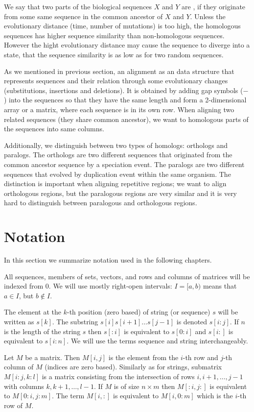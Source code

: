 We say that two parts of the biological sequences $X$ and $Y$ are
, if they originate from some same sequence in the
common ancestor of $X$ and $Y$. Unless the evolutionary distance (time, number
of mutations) is too high, the homologous sequences has higher sequence
similarity than non-homologous sequences. However the hight evolutionary
distance may cause the sequence to diverge into a state, that the sequence
similarity is as low as for two random sequences.

As we mentioned in previous section, an alignment as an data structure that
represents sequences and their relation through some evolutionary changes
(substitutions, insertions and deletions).  It is obtained by adding gap
symbols ($-$) into the sequences so that they have the same length and form a
2-dimensional array or a matrix, where each sequence is in its own row. When
aligning two related sequences (they share common ancestor), we want to
homologous parts of the sequences into same columns.

Additionally, we distinguish between two types of homologs: orthologs and
paralogs. The orthologs are two different sequences that originated from the
common ancestor sequence by a speciation event. The paralogs are two different
sequences that evolved by duplication event within the same organism. The
distinction is important when aligning repetitive regions; we want to align
orthologous regions, but the paralogous regions are very similar and it is very
hard to distinguish between paralogous and orthologous regions.

\section{Notation}

In this section we summarize notation used in the following
chapters.

All sequences, members of sets, vectors, and rows and columns of matrices will
be indexed from $0$. We will use mostly right-open intervals: $I=[a,b)$ means
that $a\in I$, but $b\notin I$. 

The element at the $k$-th position (zero based) of string (or sequence) $s$ will
be written as $s[k]$. The substring $s[i]s[i+1]\dots s[j-1]$ is denoted
$s[i:j]$.  If $n$ is the length of the string $s$ then $s[:i]$ is equivalent to
$s[0:i]$ and $s[i:]$ is equivalent to $s[i:n]$.  We will use the terms sequence
and string interchangeably.

Let $M$ be a matrix. Then $M[i,j]$ is the element from the $i$-th row and $j$-th
column of $M$ (indices are zero based). Similarly as for strings, submatrix
$M[i:j,k:l]$ is a matrix consisting from the intersection of rows $i,i+1,\dots,
j-1$ with columns $k,k+1,\dots,l-1$. If $M$ is of size $n\times m$ then
$M[:i,j:]$ is equivalent to $M[0:i,j:m]$.  The term $M[i,:]$ is equivalent to
$M[i,0:m]$ which is the $i$-th row of $M$.
